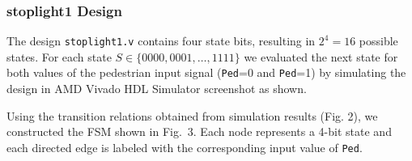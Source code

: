 \documentclass[10pt]{article}
\begin{document}
\subsubsection*{stoplight1 Design}

The design \texttt{stoplight1.v} contains four state bits, resulting in $2^4 = 16$ possible states. For each state $S \in \{0000,0001,\dots,1111\}$ we evaluated the next state for both values of the pedestrian input signal (\texttt{Ped}=0 and \texttt{Ped}=1) by simulating the design in AMD Vivado HDL Simulator screenshot as shown. 

Using the transition relations obtained from simulation results (Fig. 2), we constructed the FSM shown in Fig.~3. Each node represents a 4-bit state and each directed edge is labeled with the corresponding input value of \texttt{Ped}.
\end{document}
